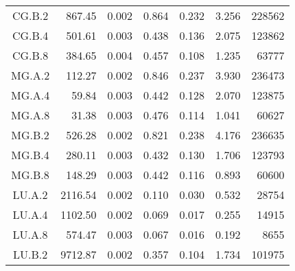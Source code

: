 \begin{longtable}[c]{c*{6}{r}}
  CG.B.2                       & 867.45                       & 0.002                        & 0.864                      & 0.232                        & 3.256 & 228562 \\
  CG.B.4                       & 501.61                       & 0.003                        & 0.438                      & 0.136                        & 2.075 & 123862 \\
  CG.B.8                       & 384.65                       & 0.004                        & 0.457                      & 0.108                        & 1.235 & 63777  \\
  MG.A.2                       & 112.27                       & 0.002                        & 0.846                      & 0.237                        & 3.930 & 236473 \\
  MG.A.4                       & 59.84                        & 0.003                        & 0.442                      & 0.128                        & 2.070 & 123875 \\
  MG.A.8                       & 31.38                        & 0.003                        & 0.476                      & 0.114                        & 1.041 & 60627  \\
  MG.B.2                       & 526.28                       & 0.002                        & 0.821                      & 0.238                        & 4.176 & 236635 \\
  MG.B.4                       & 280.11                       & 0.003                        & 0.432                      & 0.130                        & 1.706 & 123793 \\
  MG.B.8                       & 148.29                       & 0.003                        & 0.442                      & 0.116                        & 0.893 & 60600  \\
  LU.A.2                       & 2116.54                      & 0.002                        & 0.110                      & 0.030                        & 0.532 & 28754  \\
  LU.A.4                       & 1102.50                      & 0.002                        & 0.069                      & 0.017                        & 0.255 & 14915  \\
  LU.A.8                       & 574.47                       & 0.003                        & 0.067                      & 0.016                        & 0.192 & 8655   \\
  LU.B.2                       & 9712.87                      & 0.002                        & 0.357                      & 0.104                        & 1.734 & 101975 \\

\end{longtable}
